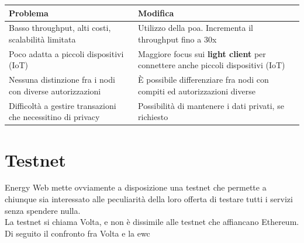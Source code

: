 \documentclass[12pt, letterpaper, twoside]{article}
\begin{document}
\begin{tabular}{||p{7cm}|p{7cm}||}
    \hline
    Problema                                                    & Modifica                                                                                \\
    \hline\hline
    Basso throughput, alti costi, scalabilità limitata          & Utilizzo della \gls{poa}. Incrementa il throughput fino a 30x                           \\
    \hline
    Poco adatta a piccoli dispositivi (IoT)                     & Maggiore focus sui \textbf{light client} per connettere anche piccoli dispositivi (IoT) \\
    \hline
    Nessuna distinzione fra i nodi con diverse autorizzazioni   & È possibile differenziare fra nodi con compiti ed autorizzazioni diverse                \\
    \hline
    Difficoltà a gestire transazioni che necessitino di privacy & Possibilità di mantenere i dati privati, se richiesto                                   \\[1ex]
    \hline
\end{tabular}
 
\newpage
 
\section{Testnet}
Energy Web mette ovviamente a disposizione una testnet che permette a chiunque sia interessato alle peculiarità della loro offerta di testare tutti i servizi senza spendere nulla. \\
La testnet si chiama Volta, e non è dissimile alle testnet che affiancano Ethereum. \\
 
Di seguito il confronto fra Volta e la \gls{ewc}
 
\end{document}
